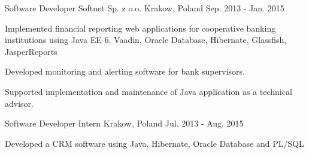 \begin{cventries}
  \cventry
    {Software Developer} %
    {Softnet Sp. z o.o.} %
    {Krakow, Poland} %
    {Sep. 2013 - Jan. 2015} %
    {
      \begin{cvitems} %
       \item {Implemented financial reporting web applications for cooperative banking institutions using Java EE 6, Vaadin, Oracle Database, Hibernate, Glassfish, JasperReports}
	  \item {Developed monitoring and alerting software for bank supervisors.} 
	  \item {Supported implementation and maintenance of Java application as a technical advisor.}
      \end{cvitems}
    }
  \cventry
    {Software Developer Intern} %
    {} %
    {Krakow, Poland} %
    {Jul. 2013 - Aug. 2015} %
    {
      \begin{cvitems} %
       \item {Developed a CRM software using Java, Hibernate, Oracle Database and PL/SQL}
      \end{cvitems}
    }
\end{cventries}
